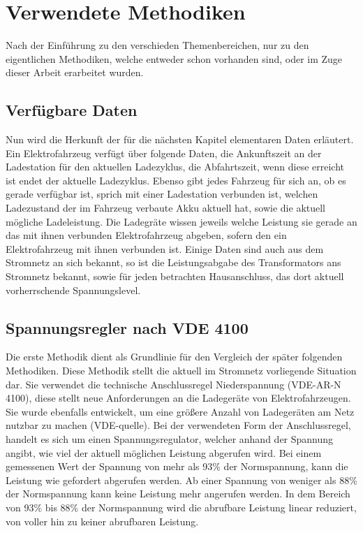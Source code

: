 \chapter{Verwendete Methodiken}
Nach der Einführung zu den verschieden Themenbereichen, nur zu den eigentlichen Methodiken, welche entweder schon vorhanden sind, oder im Zuge dieser Arbeit erarbeitet wurden.
\section{Verfügbare Daten}
\label{cap:background_sec:setting}
Nun wird die Herkunft der für die nächsten Kapitel elementaren Daten erläutert. Ein Elektrofahrzeug verfügt über folgende Daten, die Ankunftszeit an der Ladestation für den aktuellen Ladezyklus, die Abfahrtszeit, wenn diese erreicht ist endet der aktuelle Ladezyklus. Ebenso gibt jedes Fahrzeug für sich an, ob es gerade verfügbar ist, sprich mit einer Ladestation verbunden ist, welchen Ladezustand der im Fahrzeug verbaute Akku aktuell hat, sowie die aktuell mögliche Ladeleistung. Die Ladegräte wissen jeweils welche Leistung sie gerade an das mit ihnen verbunden Elektrofahrzeug abgeben, sofern den ein Elektrofahrzeug mit ihnen verbunden ist. Einige Daten sind auch aus dem Stromnetz an sich bekannt, so ist die Leistungsabgabe des Transformators ans Stromnetz bekannt, sowie für jeden betrachten Hausanschluss, das dort aktuell vorherrschende Spannungslevel.

\section{Spannungsregler nach VDE 4100}
\label{capBody:VDE}
Die erste Methodik dient als Grundlinie für den Vergleich der später folgenden Methodiken. Diese Methodik stellt die aktuell im Stromnetz vorliegende Situation dar. Sie verwendet die technische Anschlussregel Niederspannung (VDE-AR-N 4100), diese stellt neue Anforderungen an die Ladegeräte von Elektrofahrzeugen. Sie wurde ebenfalls entwickelt, um eine größere Anzahl von Ladegeräten am Netz nutzbar zu machen (VDE-quelle). Bei der verwendeten Form der Anschlussregel, handelt es sich um einen Spannungsregulator, welcher anhand der Spannung angibt, wie viel der aktuell möglichen Leistung abgerufen wird. Bei einem gemessenen Wert der Spannung von mehr als 93\% der Normspannung, kann die Leistung wie gefordert abgerufen werden. Ab einer Spannung von weniger als 88\% der Normspannung kann keine Leistung mehr angerufen werden. In dem Bereich von 93\% bis 88\% der Normspannung wird die abrufbare Leistung linear reduziert, von voller hin zu keiner abrufbaren Leistung.

